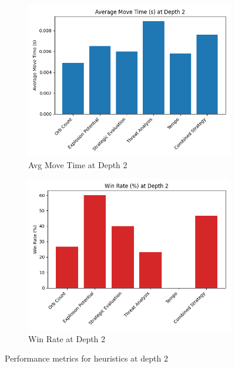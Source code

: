 \documentclass[12pt]{article}
\begin{document}
\begin{figure}[ht]
  \centering
  \begin{subfigure}[b]{0.45\textwidth}
    \includegraphics[width=\textwidth]{depth2_move_time.png}
    \caption{Avg Move Time at Depth 2}
    \label{fig:move2}
  \end{subfigure}
  \hfill
  \begin{subfigure}[b]{0.45\textwidth}
    \includegraphics[width=\textwidth]{depth2_win_rate.png}
    \caption{Win Rate at Depth 2}
    \label{fig:win2}
  \end{subfigure}
  \caption{Performance metrics for heuristics at depth 2}
  \label{fig:perf2}
\end{figure}
\end{document}
